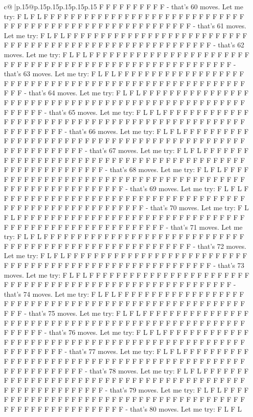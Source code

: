 \documentclass{article}
\begin{document}
{\begin{supertabular}{c@{$\;$}|p{.15\linewidth}@{}p{.15\linewidth}p{.15\linewidth}p{.15\linewidth}p{.15\linewidth}p{.15\linewidth}}
{{{F F F F F F F F F F {-} that's 60 moves. Let me try: F L F L F F F F F F F F F F F F F F F F F F F F F F F F F F F F F F F F F F F F F F F F F F F F F F F F F F F F F F F F F F {-} that's 61 moves. Let me try: F L F L F F F F F F F F F F F F F F F F F F F F F F F F F F F F F F F F F F F F F F F F F F F F F F F F F F F F F F F F F F {-} that's 62 moves. Let me try: F L F L F F F F F F F F F F F F F F F F F F F F F F F F F F F F F F F F F F F F F F F F F F F F F F F F F F F F F F F F F F {-} that's 63 moves. Let me try: F L F L F F F F F F F F F F F F F F F F F F F F F F F F F F F F F F F F F F F F F F F F F F F F F F F F F F F F F F F F F F {-} that's 64 moves. Let me try: F L F L F F F F F F F F F F F F F F F F F F F F F F F F F F F F F F F F F F F F F F F F F F F F F F F F F F F F F F F F F F {-} that's 65 moves. Let me try: F L F L F F F F F F F F F F F F F F F F F F F F F F F F F F F F F F F F F F F F F F F F F F F F F F F F F F F F F F F F F F {-} that's 66 moves. Let me try: F L F L F F F F F F F F F F F F F F F F F F F F F F F F F F F F F F F F F F F F F F F F F F F F F F F F F F F F F F F F F F {-} that's 67 moves. Let me try: F L F L F F F F F F F F F F F F F F F F F F F F F F F F F F F F F F F F F F F F F F F F F F F F F F F F F F F F F F F F F F {-} that's 68 moves. Let me try: F L F L F F F F F F F F F F F F F F F F F F F F F F F F F F F F F F F F F F F F F F F F F F F F F F F F F F F F F F F F F F {-} that's 69 moves. Let me try: F L F L F F F F F F F F F F F F F F F F F F F F F F F F F F F F F F F F F F F F F F F F F F F F F F F F F F F F F F F F F F {-} that's 70 moves. Let me try: F L F L F F F F F F F F F F F F F F F F F F F F F F F F F F F F F F F F F F F F F F F F F F F F F F F F F F F F F F F F F F {-} that's 71 moves. Let me try: F L F L F F F F F F F F F F F F F F F F F F F F F F F F F F F F F F F F F F F F F F F F F F F F F F F F F F F F F F F F F F {-} that's 72 moves. Let me try: F L F L F F F F F F F F F F F F F F F F F F F F F F F F F F F F F F F F F F F F F F F F F F F F F F F F F F F F F F F F F F {-} that's 73 moves. Let me try: F L F L F F F F F F F F F F F F F F F F F F F F F F F F F F F F F F F F F F F F F F F F F F F F F F F F F F F F F F F F F F {-} that's 74 moves. Let me try: F L F L F F F F F F F F F F F F F F F F F F F F F F F F F F F F F F F F F F F F F F F F F F F F F F F F F F F F F F F F F F {-} that's 75 moves. Let me try: F L F L F F F F F F F F F F F F F F F F F F F F F F F F F F F F F F F F F F F F F F F F F F F F F F F F F F F F F F F F F F {-} that's 76 moves. Let me try: F L F L F F F F F F F F F F F F F F F F F F F F F F F F F F F F F F F F F F F F F F F F F F F F F F F F F F F F F F F F F F {-} that's 77 moves. Let me try: F L F L F F F F F F F F F F F F F F F F F F F F F F F F F F F F F F F F F F F F F F F F F F F F F F F F F F F F F F F F F F {-} that's 78 moves. Let me try: F L F L F F F F F F F F F F F F F F F F F F F F F F F F F F F F F F F F F F F F F F F F F F F F F F F F F F F F F F F F F F {-} that's 79 moves. Let me try: F L F L F F F F F F F F F F F F F F F F F F F F F F F F F F F F F F F F F F F F F F F F F F F F F F F F F F F F F F F F F F {-} that's 80 moves. Let me try: F L F L }}}
\end{supertabular}}
\end{document}
